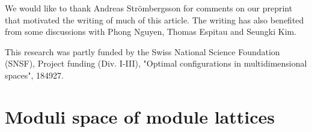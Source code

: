 \documentclass{amsart}
\DeclareMathOperator{\Tr}{tr}
\begin{document}
We would like to thank Andreas Str\"ombergsson for comments on our preprint \cite{GSV23} that motivated the writing of much of this article. The writing has also benefited from some discussions with Phong Nguyen, Thomas Espitau and Seungki Kim.  


This research was partly funded by the Swiss National Science Foundation (SNSF), Project funding (Div. I-III), "Optimal configurations in multidimensional spaces",
184927. 

\section{Moduli space of module lattices}
\label{se:module}

\end{document}

